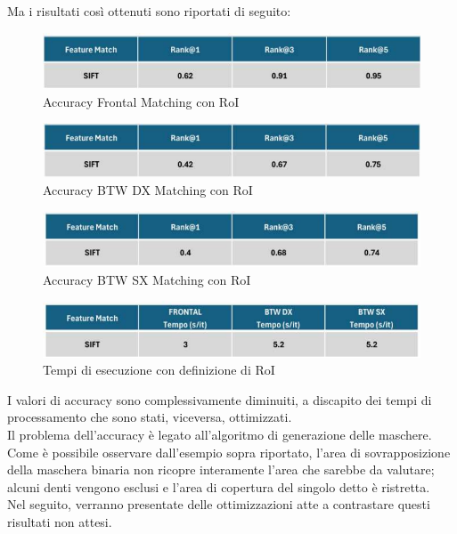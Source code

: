 \documentclass[12pt,a4paper,openright,twoside]{book}
\begin{document}
Ma i risultati così ottenuti sono riportati di seguito:
\begin{figure}[H]
	\centering
	\includegraphics{figures/frontal3.pdf}
   	\caption{Accuracy Frontal Matching con RoI}
	\label{fig:frontal3}
\end{figure}
\begin{figure}[H]
	\centering
	\includegraphics{figures/dx3.pdf}
    	\caption{Accuracy BTW DX Matching con RoI}
	\label{fig:dx3}
\end{figure}
\begin{figure}[H]
	\centering
	\includegraphics{figures/sx3.pdf}
    	\caption{Accuracy BTW SX Matching con RoI}
	\label{fig:sx3}
\end{figure}
\begin{figure}[H]
	\centering
	\includegraphics{figures/tempi3.pdf}
    	\caption{Tempi di esecuzione con definizione di RoI}
	\label{fig:tempi3}
\end{figure}

I valori di accuracy sono complessivamente diminuiti, a discapito dei tempi di processamento che sono stati, viceversa, ottimizzati.\\
Il problema dell'accuracy è legato all'algoritmo di generazione delle maschere. Come è possibile osservare dall'esempio sopra riportato, l'area di sovrapposizione della maschera binaria non ricopre interamente l'area che sarebbe da valutare; alcuni denti vengono esclusi e l'area di copertura del singolo detto è ristretta.\\
Nel seguito, verranno presentate delle ottimizzazioni atte a contrastare questi risultati non attesi.
\end{document}
